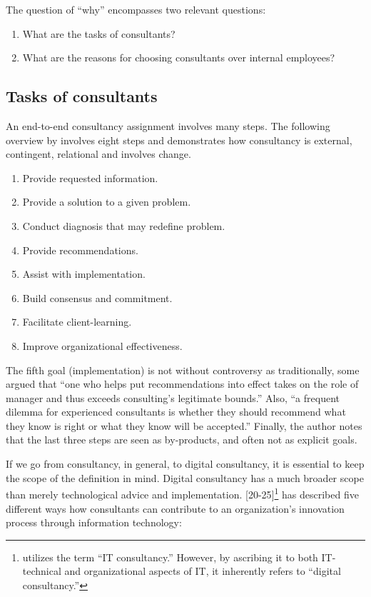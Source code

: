 \documentclass[12pt]{article}
\providecommand{\tightlist}{%
  \setlength{\itemsep}{0pt}\setlength{\parskip}{0pt}}
\begin{document}
The question of ``why'' encompasses two relevant questions:

\begin{enumerate}
\def\labelenumi{\arabic{enumi}.}
\tightlist
\item
  What are the tasks of consultants?
\item
  What are the reasons for choosing consultants over internal employees?
\end{enumerate}

\subsection{Tasks of consultants}\label{tasks-of-consultants}

An end-to-end consultancy assignment involves many steps. The following
overview by \citet{turner1982} involves eight steps and demonstrates how
consultancy is external, contingent, relational and involves change.

\begin{enumerate}
\def\labelenumi{\arabic{enumi}.}
\tightlist
\item
  Provide requested information.
\item
  Provide a solution to a given problem.
\item
  Conduct diagnosis that may redefine problem.
\item
  Provide recommendations.
\item
  Assist with implementation.
\item
  Build consensus and commitment.
\item
  Facilitate client-learning.
\item
  Improve organizational effectiveness.
\end{enumerate}

The fifth goal (implementation) is not without controversy as
traditionally, some argued that ``one who helps put recommendations into
effect takes on the role of manager and thus exceeds consulting's
legitimate bounds.'' \citep{turner1982} Also, ``a frequent dilemma for
experienced consultants is whether they should recommend what they know
is right or what they know will be accepted.'' Finally, the author notes
that the last three steps are seen as by-products, and often not as
explicit goals.

If we go from consultancy, in general, to digital consultancy, it is
essential to keep the scope of the definition in mind. Digital
consultancy has a much broader scope than merely technological advice
and implementation. \citet{swanson2010} {[}20-25{]}\footnote{\citet{swanson2010}
  utilizes the term ``IT consultancy.'' However, by ascribing it to both
  IT-technical and organizational aspects of IT, it inherently refers to
  ``digital consultancy.''} has described five different ways how
consultants can contribute to an organization's innovation process
through information technology:
\end{document}
